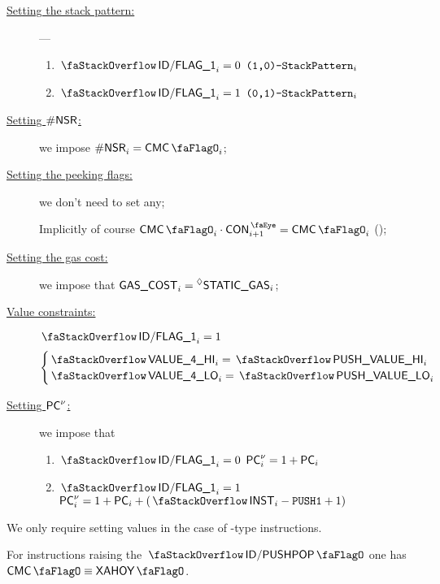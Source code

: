 \begin{description}
	\item[\underline{Setting the stack pattern:}] ---
	\begin{enumerate}
		\item \If $\decFlag{1}_{i} = 0$ \Then $\texttt{(1,0)-}\texttt{StackPattern}_{i}$
		\item \If $\decFlag{1}_{i} = 1$ \Then $\texttt{(0,1)-}\texttt{StackPattern}_{i}$
	\end{enumerate}
	\item[\underline{Setting $\textsf{\#NSR}$:}] we impose $\nonStackRows_{i} = \cmc_{i}$;
	\item[\underline{Setting the peeking flags:}] we don't need to set any;

	\saNote{} Implicitly of course $\cmc_{i} \cdot \peekContext_{i + 1} = \cmc_{i}$ (\trash);
	\item[\underline{Setting the gas cost:}] we impose that $\textsf{GAS}\textsf{\_COST}_{i} = \prescript{\lozenge}{}{\textsf{STATIC\_GAS}}_{i}$;
	\item[\underline{Value constraints:}] %
		 \If $\decFlag{1}_{i} = 1$ \Then
		\[
			\begin{cases}
				\stackItemValHi{4}_{i} = \stackPushParamHi_{i} \\
				\stackItemValLo{4}_{i} = \stackPushParamLo_{i} \\
			\end{cases}
		\]
	\item[\underline{Setting $\textsf{PC}^{\nu}$:}]
		we impose that
		\begin{enumerate}
			\item \If $\decFlag{1}_{i} = 0$ \Then $\textsf{PC}^{\nu}_{i} = 1 + \textsf{PC}_{i}$
			\item \If $\decFlag{1}_{i} = 1$ \Then $\pc\new_{i} = 1 + \pc_{i} + (\stackInst_{i} - \inst{PUSH1} + 1)$
		\end{enumerate}
\end{description}
\saNote{} We only require setting values in the case of -type instructions.

\saNote{} For instructions raising the $\stackDecPushPopFlag$ one has $\cmc \equiv \xAhoy$.
